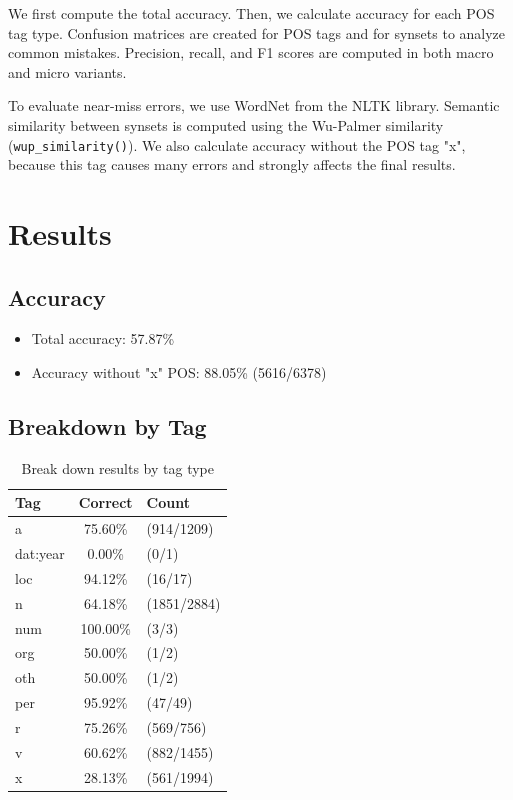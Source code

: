 \documentclass[12pt,a4paper]{article}
\begin{document}
We first compute the total accuracy. Then, we calculate accuracy for each POS tag type. Confusion matrices are created for POS tags and for synsets to analyze common mistakes. Precision, recall, and F1 scores are computed in both macro and micro variants.

To evaluate near-miss errors, we use WordNet from the NLTK library. Semantic similarity between synsets is computed using the Wu-Palmer similarity (\texttt{wup\_similarity()}). We also calculate accuracy without the POS tag "x", because this tag causes many errors and strongly affects the final results.

\section{Results}
\label{sec:results}
\subsection*{Accuracy}
\begin{itemize}
    \item Total accuracy: 57.87\%
    \item Accuracy without "x" POS: 88.05\% (5616/6378)
\end{itemize}

\subsection*{Breakdown by Tag}
\begin{table}[H]
\centering
\caption{Break down results by tag type}
\label{tab:tag-results}
\begin{tabular}{l c l}
\toprule
Tag & Correct & Count \\
\midrule
a & 75.60\% & (914/1209)\\
dat:year & 0.00\% & (0/1)\\
loc & 94.12\% & (16/17)\\
n & 64.18\% & (1851/2884)\\
num  & 100.00\% & (3/3)\\
org & 50.00\% & (1/2)\\
oth & 50.00\% & (1/2)\\
per & 95.92\% & (47/49)\\
r & 75.26\% & (569/756)\\
v & 60.62\% & (882/1455)\\
x & 28.13\% & (561/1994)\\
\bottomrule
\end{tabular}
\end{table}
\end{document}
